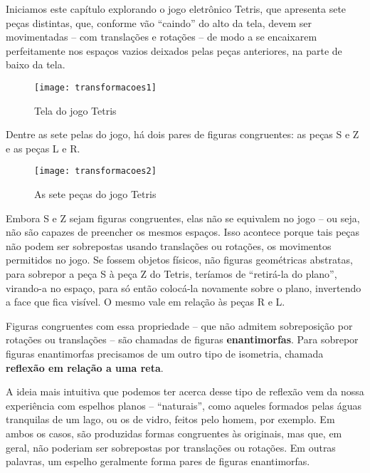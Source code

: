 
Iniciamos este capítulo explorando o jogo eletrônico Tetris, que apresenta sete peças distintas, que, conforme vão “caindo” do alto da tela, devem ser movimentadas – com translações e rotações – de modo a se encaixarem perfeitamente nos espaços vazios deixados pelas peças anteriores, na parte de baixo da tela. 

\begin{figure}[H]
\centering

\texttt{[image: transformacoes1]}
\caption{Tela do jogo Tetris}

\end{figure}

Dentre as sete pelas do jogo, há dois pares de figuras congruentes: as peças S e Z e as peças L e R. 

\begin{figure}[H]
\centering

\texttt{[image: transformacoes2]}
\caption{As sete peças do jogo Tetris}

\end{figure}

Embora S e Z sejam figuras congruentes, elas não se equivalem no jogo – ou seja, não são capazes de preencher os mesmos espaços. Isso acontece porque tais peças não podem ser sobrepostas usando translações ou rotações, os movimentos permitidos no jogo. Se fossem objetos físicos, não figuras geométricas abstratas, para sobrepor a peça S à peça Z do Tetris, teríamos de “retirá-la do plano”, virando-a no espaço, para só então colocá-la novamente sobre o plano, invertendo a face que fica visível. O mesmo vale em relação às peças R e L.

Figuras congruentes com essa propriedade – que não admitem sobreposição por rotações ou translações – são chamadas de figuras \textbf{enantimorfas}.  Para sobrepor figuras enantimorfas precisamos de um outro tipo de isometria, chamada \textbf{reflexão em relação a uma reta}. 
	
A ideia mais intuitiva que podemos ter acerca desse tipo de reflexão vem da nossa experiência com espelhos planos – “naturais”, como aqueles formados pelas águas tranquilas de um lago, ou os de vidro, feitos pelo homem, por exemplo. Em ambos os casos, são produzidas formas congruentes às originais, mas que, em geral, não poderiam ser sobrepostas por translações ou rotações. Em outras palavras, um espelho geralmente forma pares de figuras enantimorfas. 
	
